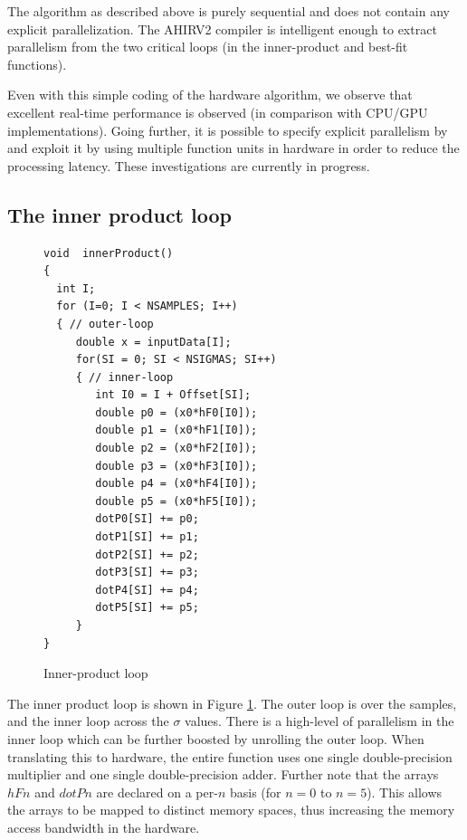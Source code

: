 \documentclass[runningheads]{llncs}
\begin{document}
The algorithm as described above is purely sequential
and does not contain any explicit parallelization.  The AHIRV2 compiler
is intelligent enough to extract parallelism from the two critical
loops (in the inner-product and best-fit functions).

Even with this simple coding of the hardware algorithm,
we observe that excellent real-time performance
is observed (in comparison with CPU/GPU implementations).
Going further, it is possible to specify explicit parallelism by
and exploit it by using multiple function units in hardware
in order to reduce the processing latency.  These investigations
are currently in progress.



\subsection{The inner product loop} \label{sec:InnerProduct}

\begin{figure}
\begin{centering}
\begin{verbatim}
void  innerProduct()
{
  int I;
  for (I=0; I < NSAMPLES; I++)
  { // outer-loop
     double x = inputData[I];
     for(SI = 0; SI < NSIGMAS; SI++)
     { // inner-loop
        int I0 = I + Offset[SI];
        double p0 = (x0*hF0[I0]);
        double p1 = (x0*hF1[I0]);
        double p2 = (x0*hF2[I0]);
        double p3 = (x0*hF3[I0]);
        double p4 = (x0*hF4[I0]);
        double p5 = (x0*hF5[I0]);
        dotP0[SI] += p0;
        dotP1[SI] += p1;
        dotP2[SI] += p2;
        dotP3[SI] += p3;
        dotP4[SI] += p4;
        dotP5[SI] += p5;
     }
}
\end{verbatim}
\end{centering}
\caption{Inner-product loop}
\label{fig:InnerProduct}
\end{figure}

The inner product loop is shown in Figure \ref{fig:InnerProduct}.
The outer loop is over the samples, and the inner
loop across the $\sigma$ values.  There is a high-level
of parallelism in the inner loop which can be further
boosted by unrolling the outer loop.   When translating
this to hardware, the entire function uses one single double-precision
multiplier and one single double-precision adder.  Further
note that the arrays $hFn$ and $dotPn$ are declared on
a per-$n$ basis (for $n=0$ to $n=5$). This allows the arrays to be mapped to
distinct memory spaces, thus increasing the memory access bandwidth in the hardware.
\end{document}
